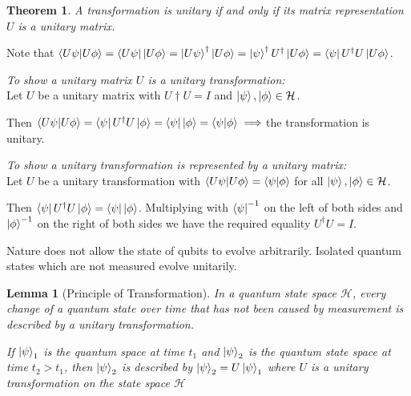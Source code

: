 \documentclass[12pt,twoside,fleqn]{report}
\makeatletter
\theoremstyle{thmstyle}
\renewenvironment{proof}[1][\proofname]{\par
\pushQED{\qed}%
\normalfont \topsep6\p@\@plus6\p@\relax
\trivlist
\item[\hskip\labelsep\itshape#1\@addpunct{.}]\mbox{}\par\nobreak\ignorespaces
}{%
    \popQED\endtrivlist\@endpefalse
    }
\newtheorem{thm}{Theorem}[chapter]
\newtheorem{lemma}{Lemma}[chapter]
\makeatother
\begin{document}
\begin{thm}
A transformation is unitary if and only if its matrix representation $U$ is a unitary matrix.
\end{thm}
\begin{proof}
    Note that $\braket{U \psi | U \phi} = \bra{U \psi} \ket{U \phi} = \ket{U \psi}^\dagger \ket{U \phi} = \ket{\psi}^\dagger U^\dagger \ket{U \phi} = \bra{\psi} U^\dagger U \ket{U\phi}$.

    \emph{To show a unitary matrix $U$ is a unitary transformation: }\\
    Let $U$ be a unitary matrix with $U\dagger U = I$ and $\ket\psi, \ket\phi \in \mathcal{H}$.

    Then $\braket{U \psi | U \phi} = \bra{\psi} U^\dagger U \ket{\phi} = \bra{\psi} \ket{\phi} = \braket{\psi|\phi} \implies $the transformation is unitary.

    \emph{To show a unitary transformation is represented by a unitary matrix: }\\
    Let $U$ be a unitary transformation with $\braket{U \psi | U \phi} = \braket{\psi|\phi}$ for all $\ket\psi, \ket\phi \in \mathcal{H}$.

    Then  $\bra{\psi} U^\dagger U \ket{\phi} = \bra{\psi} \ket{\phi}$.
    Multiplying with $\bra{\psi}^{-1}$ on the left of both sides and $\ket{\phi}^{-1}$ on the right of both sides we have the required equality $U^\dagger U = I$.
\end{proof}

Nature does not allow the state of qubits to evolve arbitrarily. Isolated quantum states which are not measured evolve unitarily.

\begin{samepage}
\begin{mdframed}
\begin{lemma}[Principle of Transformation]
    \label{transformation}
    In a quantum state space $\mathcal{H}$, every change of a quantum state over time that has not been caused by measurement is described by a unitary transformation.
    
    If $\ket{\psi}_1$ is the quantum space at time $t_1$ and $\ket{\psi}_2$ is the quantum state space at time $t_2 > t_1$, then $\ket{\psi}_2$ is described by $\ket{\psi}_2 = U \ket{\psi}_1$ where $U$ is a unitary transformation on the state space $\mathcal{H}$
\end{lemma}
\end{mdframed}
\end{samepage}
\end{document}
